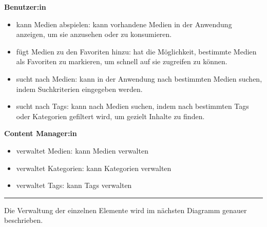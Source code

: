 





\textbf{Benutzer:in}
\begin{itemize}
    \item kann Medien abspielen: kann vorhandene Medien in der Anwendung anzeigen, um sie anzusehen oder zu konsumieren.
    \item fügt Medien zu den Favoriten hinzu: hat die Möglichkeit, bestimmte Medien als Favoriten zu markieren, um schnell auf sie zugreifen zu können.
    \item sucht nach Medien: kann in der Anwendung nach bestimmten Medien suchen, indem Suchkriterien eingegeben werden.
    \item sucht nach Tags: kann nach Medien suchen, indem nach bestimmten Tags oder Kategorien gefiltert wird, um gezielt Inhalte zu finden.
\end{itemize}
\textbf{Content Manager:in}
\begin{itemize}
    \item verwaltet Medien: kann Medien verwalten
    \item verwaltet Kategorien: kann Kategorien verwalten
    \item verwaltet Tags: kann Tags verwalten
\end{itemize}

\rule{\linewidth}{0.3pt}

Die Verwaltung der einzelnen Elemente wird im nächsten Diagramm genauer beschrieben.

